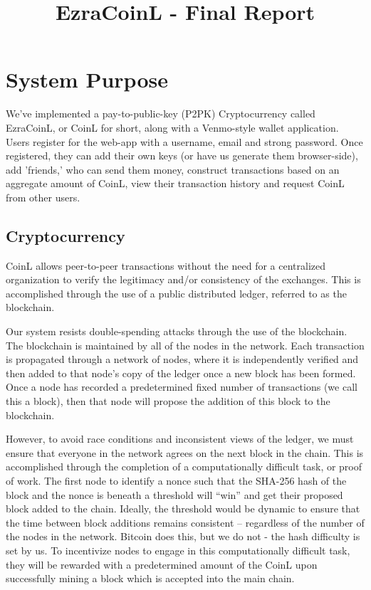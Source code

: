\documentclass[12pt]{article}
\title{EzraCoinL - Final Report}
\author{
\iam{James Cassell}{jcc384}
\and
\iam{Evan King}{esk79}
\and
\iam{Ethan Koenig}{etk39}
\and
\iam{Eric Perdew}{ecp84}
\and
\iam{Will Ronchetti}{wrr33}
}
\begin{document}
\maketitle

\section{System Purpose}

We've  implemented a pay-to-public-key (P2PK) Cryptocurrency called EzraCoinL, or CoinL for short, along with a Venmo-style wallet application. Users register for the web-app with a username, email and strong password. Once registered, they can add their own keys (or have us generate them browser-side), add 'friends,' who can send them money, construct transactions based on an aggregate amount of CoinL, view their transaction history and request CoinL from other users.

\subsection*{Cryptocurrency}

CoinL allows peer-to-peer transactions without the need for a centralized organization to verify the legitimacy and/or consistency of the exchanges.  This is accomplished through the use of a public distributed ledger, referred to as the blockchain.

Our system resists double-spending attacks through the use of the blockchain. The blockchain is maintained by all of the nodes in the network. Each transaction is propagated through a network of nodes, where it is  independently verified and then added to that node's copy of the ledger once a new block has been formed. Once a node has recorded a predetermined fixed number of transactions (we call this a block), then that node will propose the addition of this block to the blockchain. 

However, to avoid race conditions and inconsistent views of the ledger, we must ensure that everyone in the network agrees on the next block in the chain. This is accomplished through the completion of a computationally difficult task, or proof of work. The first node to identify a nonce such that the SHA-256 hash of the block and the nonce is beneath a threshold will ``win'' and get their proposed block added to the chain. Ideally, the threshold would be dynamic to ensure that the time between block additions remains consistent -- regardless of the number of the nodes in the network. Bitcoin does this, but we do not - the hash difficulty is set by us.  To incentivize nodes to engage in this computationally difficult task, they will be rewarded with a predetermined amount of the CoinL upon successfully mining a block which is accepted into the main chain.
\end{document}
